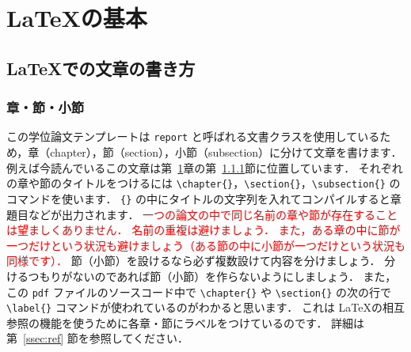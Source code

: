 \chapter{\LaTeX の基本}
\label{ch:basic}


\section{\LaTeX での文章の書き方}
\label{sec:sentence_in_LaTeX}

\subsection{章・節・小節}
\label{ssec:ch_sec_ssec}

この学位論文テンプレートは \verb|report| と呼ばれる文書クラスを使用しているため，章（chapter），節（section），小節（subsection）に分けて文章を書けます．
例えば今読んでいるこの文章は第~\ref{ch:basic}章の第~\ref{ssec:ch_sec_ssec}節に位置しています．
それぞれの章や節のタイトルをつけるには \verb|\chapter{}|，\verb|\section{}|，\verb|\subsection{}| のコマンドを使います．
\verb|{}| の中にタイトルの文字列を入れてコンパイルすると章題目などが出力されます．
\textcolor{red}{一つの論文の中で同じ名前の章や節が存在することは望ましくありません．
名前の重複は避けましょう．
また，ある章の中に節が一つだけという状況も避けましょう（ある節の中に小節が一つだけという状況も同様です）．}
節（小節）を設けるなら必ず複数設けて内容を分けましょう．
分けるつもりがないのであれば節（小節）を作らないようにしましょう．
また，この \verb|pdf| ファイルのソースコード中で \verb|\chapter{}| や \verb|\section{}| の次の行で \verb|\label{}| コマンドが使われているのがわかると思います．
これは \LaTeX の相互参照の機能を使うために各章・節にラベルをつけているのです．
詳細は第~\ref{ssec:ref} 節を参照してください．

